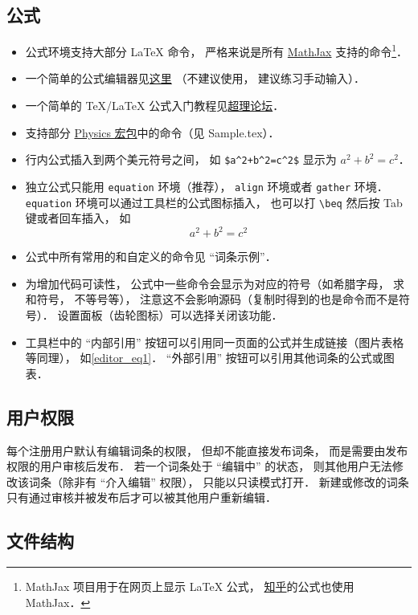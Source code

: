 \subsection{公式}
\begin{itemize}
\item 公式环境支持大部分 LaTeX 命令， 严格来说是所有 \href{https://www.mathjax.org/}{MathJax} 支持的命令\footnote{MathJax 项目用于在网页上显示 LaTeX 公式， \href{https://www.zhihu.com/}{知乎}的公式也使用 MathJax．}．
\item 一个简单的公式编辑器见\href{https://www.codecogs.com/latex/eqneditor.php}{这里} （不建议使用， 建议练习手动输入）．
\item 一个简单的 TeX/LaTeX 公式入门教程见\href{https://chaoli.club/index.php/211}{超理论坛}．
\item 支持部分 \href{http://mirrors.ibiblio.org/CTAN/macros/latex/contrib/physics/physics.pdf}{Physics 宏包}中的命令（见 Sample.tex）．
\item 行内公式插入到两个美元符号之间， 如 \verb|$a^2+b^2=c^2$| 显示为 $a^2 + b^2 = c^2$．
\item 独立公式只能用 \verb|equation| 环境（推荐）， \verb|align| 环境或者 \verb|gather| 环境． \verb|equation| 环境可以通过工具栏的公式图标插入， 也可以打 \verb|\beq| 然后按 Tab 键或者回车插入， 如
\begin{equation}\label{editor_eq1}
a^2 + b^2 = c^2
\end{equation}
\item 公式中所有常用的和自定义的命令见 “词条示例”．
\item 为增加代码可读性， 公式中一些命令会显示为对应的符号（如希腊字母， 求和符号， 不等号等）， 注意这不会影响源码（复制时得到的也是命令而不是符号）． 设置面板（齿轮图标）可以选择关闭该功能．
\item 工具栏中的 “内部引用” 按钮可以引用同一页面的公式并生成链接（图片表格等同理）， 如\autoref{editor_eq1}． “外部引用” 按钮可以引用其他词条的公式或图表．
\end{itemize}

\subsection{用户权限}
每个注册用户默认有编辑词条的权限， 但却不能直接发布词条， 而是需要由发布权限的用户审核后发布． 若一个词条处于 “编辑中” 的状态， 则其他用户无法修改该词条（除非有 “介入编辑” 权限）， 只能以只读模式打开． 新建或修改的词条只有通过审核并被发布后才可以被其他用户重新编辑．

\subsection{文件结构}

